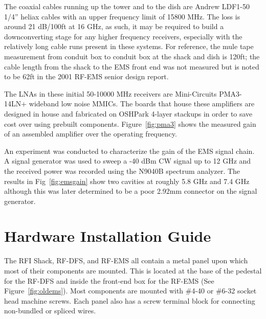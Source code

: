 \documentclass[titlepage]{article}
\begin{document}
The coaxial cables running up the tower and to the dish are Andrew LDF1-50 1/4'' heliax cables with an upper frequency limit of 15800 MHz. The loss is around 21 dB/100ft at 16 GHz, as such, it may be required to build a downconverting stage for any higher frequency receivers, especially with the relatively long cable runs present in these systems. For reference, the mule tape measurement from conduit box to conduit box at the shack and dish is 120ft; the cable length from the shack to the EMS front end was not measured but is noted to be 62ft in the 2001 RF-EMS senior design report.

The LNAs in these initial 50-10000 MHz receivers are Mini-Circuits PMA3-14LN+ wideband low noise MMICs. The boards that house these amplifiers are designed in house and fabricated on OSHPark 4-layer stackups in order to save cost over using prebuilt components. Figure~\ref{fig:pma3} shows the measured gain of an assembled amplifier over the operating frequency.

An experiment was conducted to characterize the gain of the EMS signal chain. A signal generator was used to sweep a -40 dBm CW signal up to 12 GHz and the received power was recorded using the N9040B spectrum analyzer. The results in Fig~\ref{fig:emsgain} show two cavities at roughly 5.8 GHz and 7.4 GHz although this was later determined to be a poor 2.92mm connector on the signal generator.

\section{Hardware Installation Guide}\label{sec:hig}
The RFI Shack, RF-DFS, and RF-EMS all contain a metal panel upon which most of their components are mounted. This is located at the base of the pedestal for the RF-DFS and inside the front-end box for the RF-EMS (See Figure~\ref{fig:oldems}). Most components are mounted with \#4-40 or \#6-32 socket head machine screws. Each panel also has a screw terminal block for connecting non-bundled or spliced wires.
\end{document}
